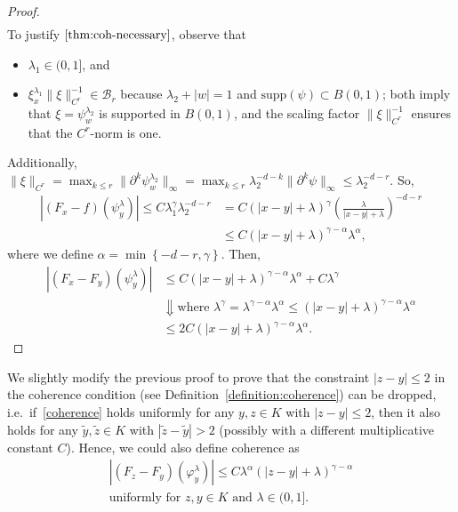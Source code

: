\begin{proof}
\begin{align}
   \end{align}
   To justify \(\eqref{thm:coh-necessary}\), observe that 
   \begin{itemize}
       \item  \(\lambda_1 \in (0, 1]\), and 
       \item  \(\xi^{\lambda_1}_x \lVert \xi \rVert_{C^{r}}^{-1} \in \mathcal{B}_{r}\) because \(\lambda_2 + |w| = 1\) and \(\mathrm{supp}(\psi) \subset B(0,1)\); both imply that \(\xi = \psi^{\lambda_2}_w\) is supported in \(B(0,1)\), and the scaling factor \(\lVert \xi \rVert_{C^{r}}^{-1}\) ensures that the \(C^r\)-norm is one.
   \end{itemize}   
   Additionally, \(\lVert \xi \rVert_{C^{r}} = \max_{k \leq r}\lVert \partial^k \psi^{\lambda_2}_w \rVert_\infty = \max_{k \leq r} \lambda_2^{-d-k} \lVert \partial^k \psi \rVert_{\infty} \leq \lambda_2^{-d - r}\). So,
   \begin{align*}
    |(F_x - f)(\psi^\lambda_y)| \leq C\lambda_1^\gamma \lambda_2^{-d-r} &= C(|x-y| + \lambda)^\gamma\left(\frac{\lambda}{|x-y|  + \lambda}\right)^{-d-r} \\
    &\leq C  (|x-y| + \lambda)^{\gamma - \alpha} \lambda^\alpha,
   \end{align*}
    where we define \(\alpha = \min\left\{ -d-r , \gamma \right\}\). Then,
    \begin{align*}
        |(F_x - F_y)(\psi^\lambda_y)| &\leq C  (|x-y| + \lambda)^{\gamma - \alpha} \lambda^\alpha + C \lambda^\gamma \\
        &\Downarrow \text{where \(\lambda^\gamma = \lambda^{\gamma - \alpha} \lambda^\alpha \leq (|x-y| + \lambda)^{\gamma - \alpha} \lambda^\alpha\)} \\
        &\leq 2C  (|x-y| + \lambda)^{\gamma - \alpha} \lambda^\alpha.
    \end{align*}
\end{proof}

We slightly modify the previous proof to prove that the constraint \(|z-y| \leq 2\) in the coherence condition (see Definition~\ref{definition:coherence}) can be dropped, i.e.\ if~\eqref{coherence} holds uniformly for any \(y,z \in K\) with \(|z-y| \leq 2\), then it also holds for any \(\tilde y, \tilde z \in K\) with \(|\tilde z- \tilde y| > 2\) (possibly with a different multiplicative constant \(C\)). Hence, we could also define coherence as
\begin{gather}\label{better-coherence}
    |(F_z - F_y)(\varphi^\lambda_y)| \leq C\lambda^\alpha(|z-y| + \lambda)^{\gamma - \alpha}  \\ \text{uniformly for \(z,y \in K\) and \(\lambda \in (0,1]\)} \nonumber.
\end{gather}

